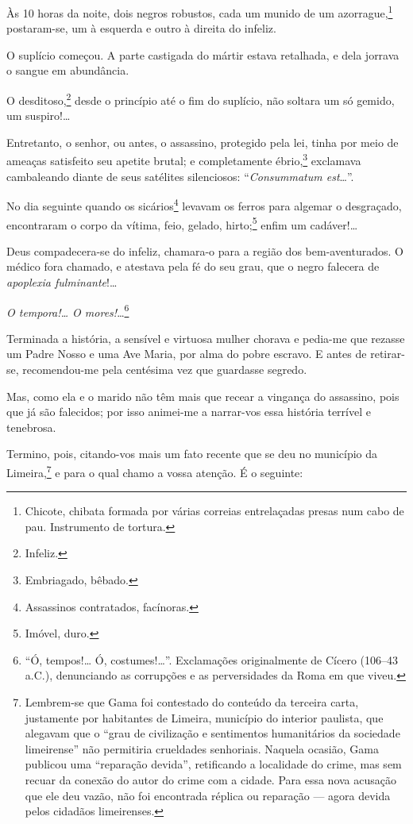 Às 10 horas da noite, dois negros robustos, cada um munido de um
azorrague,\footnote{Chicote, chibata formada por várias correias
  entrelaçadas presas num cabo de pau. Instrumento de tortura.}
postaram-se, um à esquerda e outro à direita do infeliz.

O suplício começou. A parte castigada do mártir estava retalhada, e dela
jorrava o sangue em abundância.

O desditoso,\footnote{Infeliz.} desde o princípio até o fim do
suplício, não soltara um só gemido, um suspiro!\ldots{}

Entretanto, o senhor, ou antes, o assassino, protegido pela lei, tinha
por meio de ameaças satisfeito seu apetite brutal; e completamente
ébrio,\footnote{Embriagado, bêbado.} exclamava cambaleando diante de
seus satélites silenciosos:
``\emph{Consummatum est}\ldots{}''.

No dia seguinte quando os sicários\footnote{Assassinos contratados,
  facínoras.} levavam os ferros para algemar o desgraçado, encontraram o
corpo da vítima, feio, gelado, hirto;\footnote{Imóvel, duro.} enfim um
cadáver!\ldots{}

Deus compadecera-se do infeliz, chamara-o para a região dos
bem-aventurados. O médico fora chamado, e atestava pela fé do seu grau,
que o negro falecera de \emph{apoplexia fulminante}!\ldots{}

\emph{O tempora!\ldots{} O mores!}\ldots{}\footnote{``Ó, tempos!\ldots{} Ó,
  costumes!\ldots{}''. Exclamações originalmente de Cícero (106--43 a.C.), 
  denunciando as corrupções e as perversidades da Roma em que viveu.}

Terminada a história, a sensível e virtuosa mulher chorava e pedia-me
que rezasse um Padre Nosso e uma Ave Maria, por alma do pobre escravo. E
antes de retirar-se, recomendou-me pela centésima vez que guardasse
segredo.

Mas, como ela e o marido não têm mais que recear a vingança do
assassino, pois que já são falecidos; por isso animei-me a narrar-vos
essa história terrível e tenebrosa.

Termino, pois, citando-vos mais um fato recente que se deu no município
da Limeira,\footnote{Lembrem-se que Gama foi contestado do conteúdo da
  terceira carta, justamente por habitantes de Limeira, município do
  interior paulista, que alegavam que o ``grau de civilização e
  sentimentos humanitários da sociedade limeirense'' não permitiria
  crueldades senhoriais. Naquela ocasião, Gama publicou uma ``reparação
  devida'', retificando a localidade do crime, mas sem recuar da conexão
  do autor do crime com a cidade. Para essa nova acusação que ele deu vazão,
  não foi encontrada réplica ou reparação --- agora devida pelos
  cidadãos limeirenses.} e para o qual chamo a vossa atenção. É o
seguinte:

